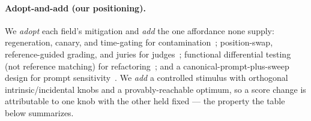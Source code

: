 \documentclass[11pt]{article}
\begin{document}
\paragraph{Adopt-and-add (our positioning).} We \emph{adopt} each field's mitigation and
\emph{add} the one affordance none supply: regeneration, canary, and time-gating for
contamination~\citep{jain-etal-2025-livecodebench,mirzadeh-etal-2024-gsm,zhu-etal-2024-dyval,jacovi-etal-2023-stop};
position-swap, reference-guided grading, and juries for
judges~\citep{zheng-etal-2023-judging,verga-etal-2024-replacing}; functional differential testing (not
reference matching) for refactoring~\citep{liu-etal-2023-code,gautam-etal-2025-refactorbench}; and a
canonical-prompt-plus-sweep design for prompt
sensitivity~\citep{liang-etal-2023-holistic,zhu-etal-2023-promptrobust,sclar-etal-2024-quantifying}. We \emph{add} a
controlled stimulus with orthogonal intrinsic/incidental knobs and a provably-reachable
optimum, so a score change is attributable to one knob with the other held fixed --- the
property the table below summarizes.
\end{document}
